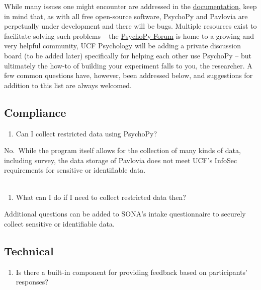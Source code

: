 \documentclass[
]{book}
\providecommand{\tightlist}{%
  \setlength{\itemsep}{0pt}\setlength{\parskip}{0pt}}
\begin{document}
While many issues one might encounter are addressed in the \href{https://www.psychopy.org/documentation.html}{documentation}, keep in mind that, as with all free open-source software, PsychoPy and Pavlovia are perpetually under development and there will be bugs. Multiple resources exist to facilitate solving such problems -- the \href{https://discourse.psychopy.org/}{PsychoPy Forum} is home to a growing and very helpful community, UCF Psychology
will be adding a private discussion board (to be added later) specifically for helping each other use PsychoPy -- but ultimately the how-to of building your experiment falls to you, the researcher. A few common questions have, however, been addressed below, and suggestions for addition to this list are always welcomed.

\hypertarget{compliance}{%
\subsection{Compliance}\label{compliance}}

\begin{enumerate}
\def\labelenumi{(\arabic{enumi})}
\tightlist
\item
  Can I collect restricted data using PsychoPy?
\end{enumerate}

No.~While the program itself allows for the collection of many kinds of data, including survey, the data storage of Pavlovia does not meet UCF's InfoSec requirements for sensitive or identifiable data.\\
~\\

\begin{enumerate}
\def\labelenumi{(\arabic{enumi})}
\setcounter{enumi}{1}
\tightlist
\item
  What can I do if I need to collect restricted data then?
\end{enumerate}

Additional questions can be added to SONA's intake questionnaire to securely collect sensitive or identifiable data.

\hypertarget{technical}{%
\subsection{Technical}\label{technical}}

\begin{enumerate}
\def\labelenumi{(\arabic{enumi})}
\setcounter{enumi}{2}
\tightlist
\item
  Is there a built-in component for providing feedback based on participants' responses?
\end{enumerate}
\end{document}
